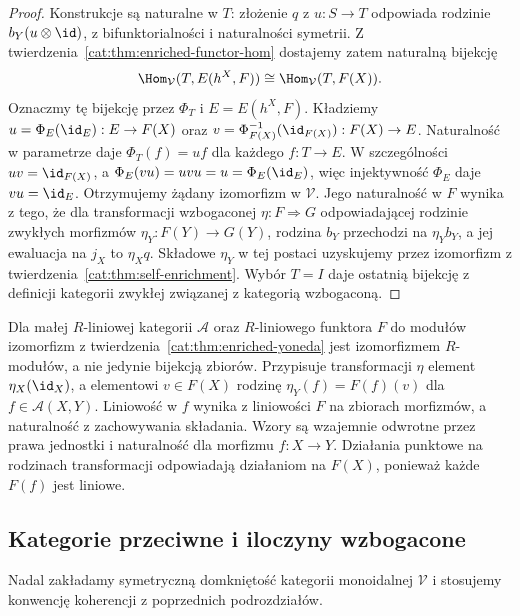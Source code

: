 \begin{proof}
Konstrukcje są naturalne w $T$: złożenie $q$ z $u:S\to T$ odpowiada rodzinie $b_Y(u\otimes\id)$, z bifunktorialności i naturalności symetrii. Z twierdzenia~\ref{cat:thm:enriched-functor-hom} dostajemy zatem naturalną bijekcję
\[
 \Hom_{\mathcal V}(T,E(h^X,F))\cong\Hom_{\mathcal V}(T,F(X)).
\]
Oznaczmy tę bijekcję przez $\Phi_T$ i $E=E(h^X,F)$. Kładziemy $u=\Phi_E(\id_E):E\to F(X)$ oraz $v=\Phi_{F(X)}^{-1}(\id_{F(X)}):F(X)\to E$. Naturalność w parametrze daje $\Phi_T(f)=uf$ dla każdego $f:T\to E$. W szczególności $uv=\id_{F(X)}$, a $\Phi_E(vu)=uvu=u=\Phi_E(\id_E)$, więc injektywność $\Phi_E$ daje $vu=\id_E$. Otrzymujemy żądany izomorfizm w $\mathcal V$. Jego naturalność w $F$ wynika z tego, że dla transformacji wzbogaconej $\eta:F\Rightarrow G$ odpowiadającej rodzinie zwykłych morfizmów $\eta_Y:F(Y)\to G(Y)$, rodzina $b_Y$ przechodzi na $\eta_Yb_Y$, a jej ewaluacja na $j_X$ to $\eta_Xq$. Składowe $\eta_Y$ w tej postaci uzyskujemy przez izomorfizm z twierdzenia~\ref{cat:thm:self-enrichment}. Wybór $T=I$ daje ostatnią bijekcję z definicji kategorii zwykłej związanej z kategorią wzbogaconą.
\end{proof}

\begin{przyklad}\label{cat:ex:enriched-linear-yoneda}
Dla małej $R$-liniowej kategorii $\mathcal A$ oraz $R$-liniowego funktora $F$ do modułów izomorfizm z twierdzenia~\ref{cat:thm:enriched-yoneda} jest izomorfizmem $R$-modułów, a nie jedynie bijekcją zbiorów. Przypisuje transformacji $\eta$ element $\eta_X(\id_X)$, a elementowi $v\in F(X)$ rodzinę $\eta_Y(f)=F(f)(v)$ dla $f\in\mathcal A(X,Y)$. Liniowość w $f$ wynika z liniowości $F$ na zbiorach morfizmów, a naturalność z zachowywania składania. Wzory są wzajemnie odwrotne przez prawa jednostki i naturalność dla morfizmu $f:X\to Y$. Działania punktowe na rodzinach transformacji odpowiadają działaniom na $F(X)$, ponieważ każde $F(f)$ jest liniowe.
\end{przyklad}


\subsection{Kategorie przeciwne i iloczyny wzbogacone}

Nadal zakładamy symetryczną domkniętość kategorii monoidalnej $\mathcal V$ i stosujemy konwencję koherencji z poprzednich podrozdziałów.

